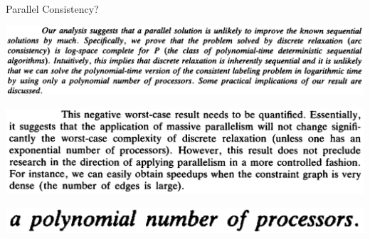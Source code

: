 \documentclass{beamer}
\begin{document}
\begin{frame}{Parallel Consistency?}
{        \vspace{2em}

        \centering\includegraphics[keepaspectratio=true,scale=0.1]{acpc-abstract.png}

        \vspace{2em}

        \centering\includegraphics[keepaspectratio=true,scale=0.1]{acpc-practical.png}

        \vspace{0em}
    }



     {
        \centering\includegraphics[keepaspectratio=true,scale=0.4]{acpc-poly.png}

        \vspace{0em}
    }
\end{frame}
\end{document}
